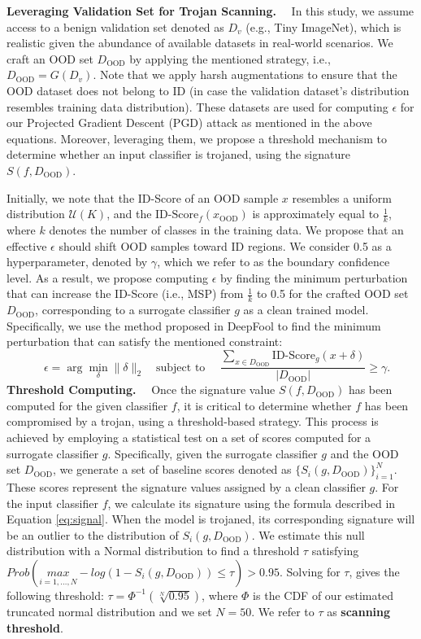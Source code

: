 \textbf{Leveraging Validation Set for Trojan Scanning.} \ \
In this study, we assume access to a benign validation set denoted as $D_v$ (e.g., Tiny ImageNet), which is realistic given the abundance of available datasets in real-world scenarios. We craft an OOD set $D_{\text{OOD}}$ by applying the mentioned strategy, i.e., $D_{\text{OOD}} = G(D_v)$. Note that we apply harsh augmentations to ensure that the OOD dataset does not belong to ID (in case the validation dataset's distribution resembles training data distribution). These datasets are used for computing $\epsilon$ for our Projected Gradient Descent (PGD) attack as mentioned in the above equations. Moreover, leveraging them, we propose a threshold mechanism to determine whether an input classifier is trojaned, using the signature $S(f, D_{\text{OOD}})$.


Initially, we note that the ID-Score of an OOD sample \(x\) resembles a uniform distribution \(\mathcal{U}(K)\), and the \(\text{ID-Score}_f(x_{\text{OOD}})\) is approximately equal to \(\frac{1}{k}\), where \(k\) denotes the number of classes in the training data. We propose that an effective \(\epsilon\) should shift OOD samples toward ID regions. We consider 0.5 as a hyperparameter, denoted by \(\gamma\), which we refer to as the boundary confidence level. As a result, we propose computing \(\epsilon\) by finding the minimum perturbation that can increase the ID-Score (i.e., MSP) from \(\frac{1}{k}\) to 0.5 for the crafted OOD set \(D_{\text{OOD}}\), corresponding to a surrogate classifier \(g\) as a clean trained model. Specifically, we use the method proposed in DeepFool \cite{deepfool} to find the minimum perturbation that can satisfy the mentioned constraint:
{\small
\begin{equation}
 \quad \epsilon = \arg \min_{\delta} \|\delta\|_{2} \quad \text{subject to } \quad \frac{ \sum_{x\in D_{\text{OOD}}}{\text{ID-Score}_{g}(x + \delta)}}{|D_{\text{OOD}}|} \ge \gamma.
\end{equation}
}
\textbf{Threshold Computing.} \ \
Once the signature value \( S(f, D_{\text{OOD}}) \) has been computed for the given classifier \( f \), it is critical to determine whether \( f \) has been compromised by a trojan, using a threshold-based strategy. This process is achieved by employing a statistical test on a set of scores computed for a surrogate classifier \( g \). Specifically, given the surrogate classifier \( g \) and the OOD set \( D_{\text{OOD}} \), we generate a set of baseline scores denoted as \(\{ S_i(g, D_{\text{OOD}})\}_{i=1}^{N} \). These scores represent the signature values assigned by a clean classifier \( g \). For the input classifier \( f \), we calculate its signature using the formula described in Equation \ref{eq:signal}. When the model is trojaned, its corresponding signature will be an outlier to the distribution of \( S_i(g, D_{\text{OOD}}) \).
We estimate this null distribution with a Normal distribution to find a threshold $\tau$ satisfying \(Prob(\underset{i=1,\ldots,N}{max} -log(1 - S_i(g, D_{\text{OOD}})) \leq \tau) > 0.95 \). Solving for $\tau$, gives the following threshold: $\tau = \Phi^{-1}_{\text{}}(\sqrt[N]{0.95})$, where $\Phi$ is the CDF of our estimated truncated normal distribution and we set $N=50$. We refer to $\tau$ as 
\textbf{scanning threshold}.

